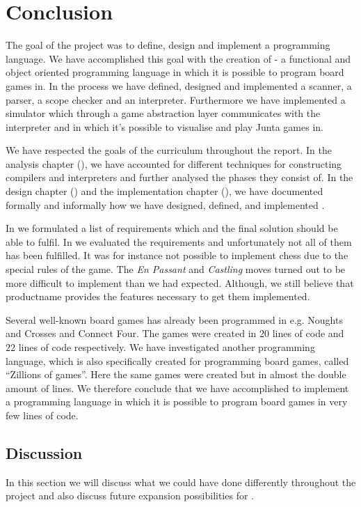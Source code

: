 \chapter{Conclusion}
\label{chap:conclusion}

The goal of the project was to define, design and implement a programming language. 
We have accomplished this goal with the creation of \productname{} - a functional and object oriented programming
language in which it is possible to program board games in. In the process we have defined, 
designed and implemented a scanner, a parser, a scope checker and an interpreter. 
Furthermore we have implemented a simulator which through a game abstraction layer 
communicates with the interpreter and in which it's possible to visualise and play Junta games in.

We have respected the goals of the curriculum throughout the
report. In the analysis chapter (), we
have accounted for different techniques for constructing compilers and interpreters 
and further analysed the phases they consist of. In the design
chapter () and the implementation chapter
(), we have documented formally and
informally how we have designed, defined, and implemented \productname{}.

In  we formulated a list of requirements which \productname{} and the final solution should be
able to fulfil. In  we evaluated the requirements and unfortunately not all of them
has been fulfilled. It was for instance not possible to implement chess due to the special rules of the game.
The \textit{En Passant} and \textit{Castling} moves turned out to be more
difficult to implement than we had expected. Although, we still believe that productname{} provides the features 
necessary to get them implemented.

Several well-known board games has already been programmed in \productname{} e.g. Noughts and
Crosses and Connect Four. The games were created in $20$ lines of code and $22$ lines of code respectively. 
We have investigated another programming language, which is also specifically created for programming board games, called ``Zillions of games''. Here the
same games were created but in almost the double amount of lines. We therefore conclude that we have accomplished to
implement a programming language in which it is possible to program board games in very few lines of code.


\section{Discussion}
\label{sec:discussion}

In this section we will discuss what we could have done differently throughout
the project and also discuss future expansion possibilities for \productname{}.

%






